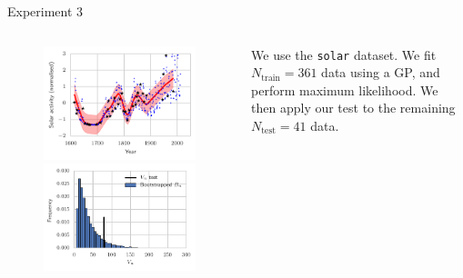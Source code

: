 \documentclass{beamer}
\begin{document}
  \begin{frame}{Experiment 3}
\begin{columns}
        \begin{column}{.5\textwidth}
        \begin{figure}
           \includegraphics[width=\textwidth]{img/gp_regression_data_fit} 
             
             \includegraphics[width=\textwidth]{img/gp_regression_bootstrap_hist} 
        \end{figure}
        \end{column}
        \begin{column}{.5\textwidth}
       We use the \texttt{solar} dataset. We fit $N_{\text{train}}=361$
data using a GP, and perform  maximum likelihood. We then apply our test
to the remaining $N_{\text{test}}=41$ data.
        \end{column}
    \end{columns}
 
 \end{frame}
\end{document}
